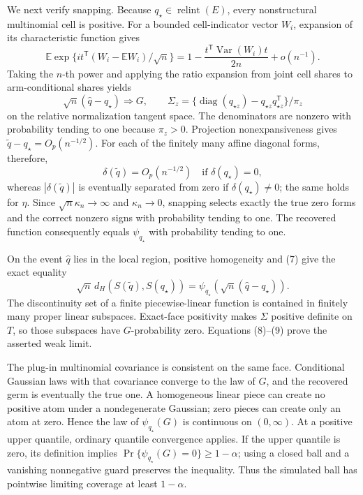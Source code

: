 We next verify snapping.  Because \(q_\star\in\operatorname{relint}(E)\), every nonstructural multinomial cell is positive.  For a bounded cell-indicator vector \(W_i\), expansion of its characteristic function gives
\[
\mathbb E\exp\{i t^{\mathsf T}(W_i-\mathbb EW_i)/\sqrt n\}
=1-\frac{t^{\mathsf T}\operatorname{Var}(W_i)t}{2n}+o(n^{-1}).
\]
Taking the \(n\)-th power and applying the ratio expansion from joint cell shares to arm-conditional shares yields
\[
\sqrt n(\widehat q-q_\star)\Rightarrow G,\qquad
\Sigma_z=\{\operatorname{diag}(q_{\star z})-q_{\star z}q_{\star z}^{\mathsf T}\}/\pi_z
\tag{8}
\]
on the relative normalization tangent space.  The denominators are nonzero with probability tending to one because \(\pi_z>0\).  Projection nonexpansiveness gives \(\widetilde q-q_\star=O_p(n^{-1/2})\).  For each of the finitely many affine diagonal forms, therefore,
\[
\delta(\widetilde q)=O_p(n^{-1/2})\quad\text{if }\delta(q_\star)=0,
\]
whereas \(|\delta(\widetilde q)|\) is eventually separated from zero if \(\delta(q_\star)\ne0\); the same holds for \(\eta\).  Since \(\sqrt n\kappa_n\to\infty\) and \(\kappa_n\to0\), snapping selects exactly the true zero forms and the correct nonzero signs with probability tending to one.  The recovered function consequently equals \(\psi_{q_\star}\) with probability tending to one.

On the event \(\widehat q\) lies in the local region, positive homogeneity and (7) give the exact equality
\[
\sqrt n\,d_H(S(\widetilde q),S(q_\star))
=\psi_{q_\star}\!\left(\sqrt n(\widehat q-q_\star)\right).
\tag{9}
\]
The discontinuity set of a finite piecewise-linear function is contained in finitely many proper linear subspaces.  Exact-face positivity makes \(\Sigma\) positive definite on \(T\), so those subspaces have \(G\)-probability zero.  Equations (8)--(9) prove the asserted weak limit.

The plug-in multinomial covariance is consistent on the same face.  Conditional Gaussian laws with that covariance converge to the law of \(G\), and the recovered germ is eventually the true one.  A homogeneous linear piece can create no positive atom under a nondegenerate Gaussian; zero pieces can create only an atom at zero.  Hence the law of \(\psi_{q_\star}(G)\) is continuous on \((0,\infty)\).  At a positive upper quantile, ordinary quantile convergence applies.  If the upper quantile is zero, its definition implies \(\Pr\{\psi_{q_\star}(G)=0\}\ge1-\alpha\); using a closed ball and a vanishing nonnegative guard preserves the inequality.  Thus the simulated ball has pointwise limiting coverage at least \(1-\alpha\).

